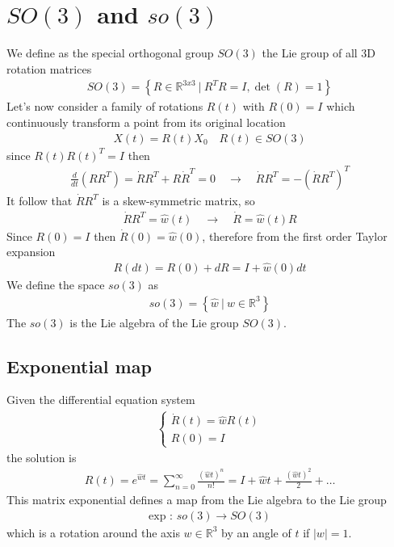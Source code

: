 \documentclass{report}
\begin{document}
\section{$SO(3)$ and $so(3)$}
\noindent We define as the special orthogonal group $SO(3)$ the Lie group of all 3D rotation matrices
\begin{align}
    SO(3) = \left\{  R \in \mathbb{R}^{3x3} \ | \ R^TR = I, \det(R)=1 \right\}
\end{align} 
Let's now consider a family of rotations $R(t)$ with $R(0)=I$ which continuously transform a point from its original location
\begin{align}
    X(t) = R(t)X_0 \quad R(t) \in SO(3)
\end{align}
since $R(t)R(t)^T=I$ then
\begin{align}
    \frac{d}{dt}(RR^T) = \dot{R}R^T + R\dot{R}^T = 0 \quad \rightarrow \quad \dot{R}R^T = -(\dot{R}R^T)^T 
\end{align}
It follow that $\dot{R}R^T$ is a skew-symmetric matrix, so
\begin{align}
    \dot{R}R^T = \hat{w}(t) \quad \rightarrow \quad \dot{R}= \hat{w}(t)R
\end{align}
Since $R(0) = I$ then $\dot{R}(0) = \hat{w}(0)$, therefore from the first order Taylor expansion
\begin{align}
    R(dt) = R(0) + dR = I + \hat{w}(0)dt
\end{align}
We define the space $so(3)$ as
\begin{align}
    so(3) = \left\{\hat{w} \ | \ w \in \mathbb{R}^3\right\}
\end{align}
The $so(3)$ is the Lie algebra of the Lie group $SO(3)$.

\subsection{Exponential map}
Given the differential equation system
\begin{align}
    \begin{cases}
        \dot{R}(t)= \hat{w}R(t)\\
        R(0) = I
    \end{cases}
\end{align}
the solution is
\begin{align}
    R(t) = e^{\hat{w}t} = \sum_{n=0}^{\infty} \frac{(\hat{w}t)^n}{n!} = I + \hat{w}t + \frac{(\hat{w}t)^2}{2} + \dots
\end{align}
This matrix exponential defines a map from the Lie algebra to the Lie group
\begin{align}
    \text{exp : } so(3) \rightarrow SO(3)
\end{align}
which is a rotation around the axis $w \in \mathbb{R}^3$ by an angle of $t$ if $|w| = 1$.
\end{document}
